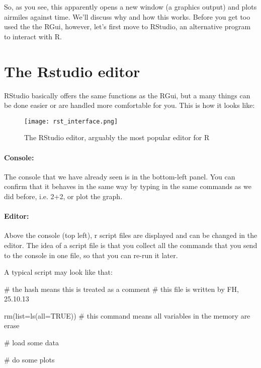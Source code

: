 \documentclass[a4paper,twoside]{tufte-book}\usepackage[]{graphicx}\usepackage[]{color}
\begin{document}
\begin{appendices}
So, as you see, this apparently opens a new window (a graphics output) and plots airmiles against time. We'll discuss why and how this works. Before you get too used the the RGui, however, let's first move to RStudio, an alternative program to interact with R.

\section{The Rstudio editor}
 
RStudio basically offers the same functions as the RGui, but a many things can be done easier or are handled more comfortable for you. This is how it looks like:

\begin{figure}[]
\begin{center}
\texttt{[image: rst\_interface.png]}
\caption{The RStudio editor, arguably the most popular editor for R}
\label{fig: Rstudio}
\end{center}
\end{figure}


\paragraph{Console:} The console that we have already seen is in the bottom-left panel. You can confirm that it behaves in the same way by typing in the same commands as we did before, i.e. 2+2, or plot the graph.

\paragraph{Editor:} Above the console (top left), r script files are displayed and can be changed in the editor. The idea of a script file is that you collect all the commands that you send to the console in one file, so that you can re-run it later.  

A typical script may look like that:

\begin{Schunk}
\begin{Sinput}
# the hash means this is treated as a comment
# this file is written by FH, 25.10.13

rm(list=ls(all=TRUE))  # this command means all variables in the memory are erase

# load some data

# do some plots
\end{Sinput}
\end{Schunk}


\end{appendices}
\end{document}
